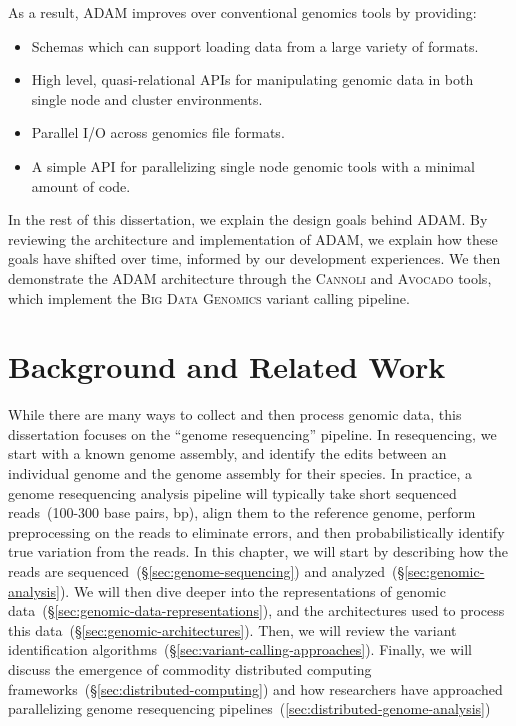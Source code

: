 \documentclass[phd]{ucbthesis}
\begin{document}
As a result, \textsc{ADAM} improves over conventional genomics tools by providing:

\begin{itemize}
\item Schemas which can support loading data from a large variety of formats.
\item High level, quasi-relational APIs for manipulating genomic data in both
  single node and cluster environments.
\item Parallel I/O across genomics file formats.
\item A simple API for parallelizing single node genomic tools with a minimal
  amount of code.
\end{itemize}

In the rest of this dissertation, we explain the design goals behind 
\textsc{ADAM}. By reviewing the architecture and implementation of
\textsc{ADAM}, we explain how these goals have shifted over time, informed by
our development experiences. We then demonstrate the \textsc{ADAM} architecture
through the \textsc{Cannoli} and \textsc{Avocado} tools, which implement the
\textsc{Big Data Genomics} variant calling pipeline.

\chapter{Background and Related Work}
\label{chap:background}

While there are many ways to collect and then process genomic data, this
dissertation focuses on the ``genome resequencing'' pipeline. In resequencing,
we start with a known genome assembly, and identify the edits between an
individual genome and the genome assembly for their species. In practice, a
genome resequencing analysis pipeline will typically take short sequenced
reads~(100-300 base pairs, bp), align them to the reference genome, perform
preprocessing on the reads to eliminate errors, and then probabilistically
identify true variation from the reads. In this chapter, we will start by
describing how the reads are sequenced~(\S\ref{sec:genome-sequencing}) and
analyzed~(\S\ref{sec:genomic-analysis}). We will then dive deeper into the
representations of genomic data~(\S\ref{sec:genomic-data-representations}),
and the architectures used to process this
data~(\S\ref{sec:genomic-architectures}). Then, we will review the variant
identification algorithms~(\S\ref{sec:variant-calling-approaches}). Finally,
we will discuss the emergence of commodity distributed computing
frameworks~(\S\ref{sec:distributed-computing}) and how researchers have
approached parallelizing genome resequencing
pipelines~(\ref{sec:distributed-genome-analysis})
\end{document}
